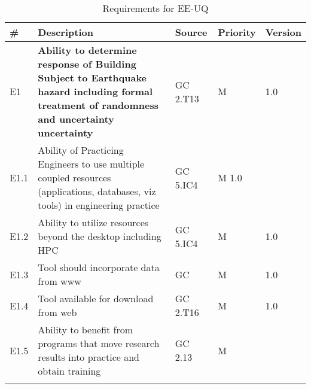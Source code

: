 \begin{longtable}{| p{} | p{} | p{} | p{} |  p{} |}

  \caption{Requirements for EE-UQ}
  \label{tab:featureRequirements}    
     \\
   \hline
\rowcolor{lightgray}

      \# & Description & Source & Priority & Version \\ \hline
      E1 & \textbf{Ability to determine response of Building Subject to Earthquake hazard including formal treatment of randomness and uncertainty uncertainty} & GC 2.T13 & M  & 1.0  \\ \hline
 E1.1 & Ability of Practicing Engineers to use multiple coupled resources (applications, databases, viz tools) in engineering practice & GC 5.IC4 & M 1.0 & \\ \hline
E1.2 & Ability to utilize resources beyond the desktop including HPC & GC 5.IC4 & M & 1.0 \\ \hline
E1.3 & Tool should incorporate data from www & GC & M & 1.0 \\ \hline
E1.4 & Tool available for download from web & GC 2.T16 & M & 1.0 \\ \hline
E1.5 & Ability to benefit from programs that move research results into practice and obtain training & GC 2.13 & M & \\ \hhline{=====}


\end{longtable}
